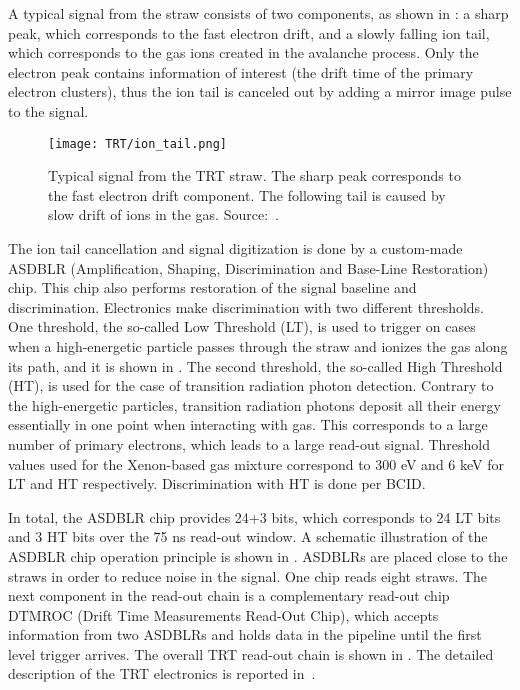 A typical signal from the straw consists of two components, as shown in : 
a sharp peak, which corresponds to the fast electron drift, and a slowly falling ion tail, which corresponds to the gas ions created in the avalanche process.
Only the electron peak contains information of interest (the drift time of the primary electron clusters), thus the ion tail is canceled out by adding a mirror image pulse to the signal.

\begin{figure}
\centering
\texttt{[image: TRT/ion\_tail.png]}
\caption{ 
 Typical signal from the TRT straw. The sharp peak corresponds to the fast electron drift component.
 The following tail is caused by slow drift of ions in the gas.
 Source:~\cite{ID_TDR_vol2}.
}
\label{fig:ion_tail}
\end{figure}

The ion tail cancellation and signal digitization is done by a custom-made ASDBLR (Amplification, Shaping, Discrimination and Base-Line Restoration) chip. 
This chip also performs restoration of the signal baseline and discrimination. 
Electronics make discrimination with two different thresholds. One threshold, the so-called Low Threshold (LT), 
is used to trigger on cases when a high-energetic particle passes through the straw and ionizes the gas along its path, and it is shown in .
The second threshold, the so-called High Threshold (HT), is used for the case of transition radiation photon detection.
Contrary to the high-energetic particles, transition radiation photons deposit all their energy essentially in one point when interacting with gas.
This corresponds to a large number of primary electrons, which leads to a large read-out signal.
Threshold values used for the Xenon-based gas mixture correspond to 300 eV and 6 keV for LT and HT respectively.
Discrimination with HT is done per BCID. 

In total, the ASDBLR chip provides 24+3 bits, which corresponds to 24 LT bits and 3 HT bits over the 75 ns read-out window.
A schematic illustration of the ASDBLR chip operation principle is shown in .
ASDBLRs are placed close to the straws in order to reduce noise in the signal. One chip reads eight straws.
The next component in the read-out chain is a complementary read-out chip DTMROC (Drift Time Measurements Read-Out Chip), which accepts 
information from two ASDBLRs and holds data in the pipeline until the first level trigger arrives. 
The overall TRT read-out chain is shown in . The detailed description of the TRT electronics is reported in~\cite{TRT_electronics}.

